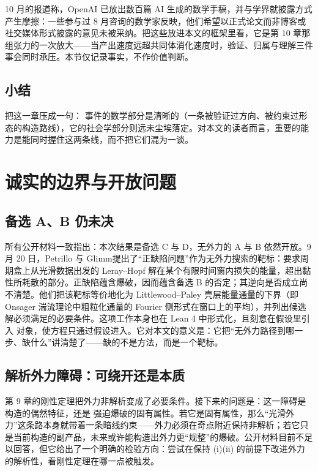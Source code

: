10 月的报道称，OpenAI 已放出数百篇 AI 生成的数学手稿，并与学界就披露方式产生摩擦：一些参与过 8 月咨询的数学家反映，他们希望以正式论文而非博客或社交媒体形式披露的意见未被采纳。把这些放进本文的框架里看，它是第 10 章那组张力的一次放大——当产出速度远超共同体消化速度时，验证、归属与理解三件事会同时承压。本节仅记录事实，不作价值判断。

\subsection{小结}

把这一章压成一句：\NS{} 事件的数学部分是清晰的（一条被验证过方向、被约束过形态的构造路线），它的社会学部分则远未尘埃落定。对本文的读者而言，重要的能力是能同时握住这两条线，而不把它们混为一谈。

\section{诚实的边界与开放问题}

\subsection{备选 A、B 仍未决}

所有公开材料一致指出：本次结果是备选 C 与 D，无外力的 A 与 B 依然开放。9 月 20 日，Petrillo 与 Glimm\cite{petrillo-glimm}提出了“正缺陷问题”作为无外力搜索的靶标：要求周期盒上从光滑数据出发的 Leray--Hopf 解在某个有限时间窗内损失的能量，超出黏性所耗散的部分。正缺陷蕴含爆破，因而蕴含备选 B 的否定；其逆向是否成立尚不清楚。他们把该靶标等价地化为 Littlewood--Paley 壳层能量通量的下界（即 Onsager 湍流理论中粗粒化通量的 Fourier 侧形式在窗口上的平均），并列出候选解必须满足的必要条件。这项工作本身也在 Lean 4 中形式化，且刻意在假设里引入 \NS{} 对象，使方程只通过假设进入。它对本文的意义是：它把“无外力路径到哪一步、缺什么”讲清楚了——缺的不是方法，而是一个靶标。

\subsection{解析外力障碍：可绕开还是本质}

第 9 章的刚性定理把外力非解析变成了必要条件。接下来的问题是：这一障碍是构造的偶然特征，还是 \NS{} 强迫爆破的固有属性。若它是固有属性，那么“光滑外力”这条路本身就带着一条暗线约束——外力必须在奇点附近保持非解析；若它只是当前构造的副产品，未来或许能构造出外力更“规整”的爆破。公开材料目前不足以回答，但它给出了一个明确的检验方向：尝试在保持 (i)(ii) 的前提下改进外力的解析性，看刚性定理在哪一点被触发。

